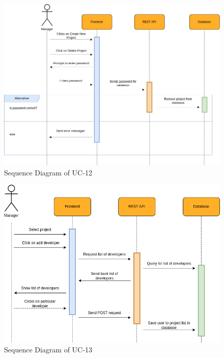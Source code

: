         \begin{figure}[H]
            \centering
            \includegraphics[scale=0.5]{./diagrams/sequence/seq-12.png}
            \caption{Sequence Diagram of UC-12}
            \label{fig:seq-12}
            
        \end{figure}
    

        \begin{figure}[H]
            \centering
            \includegraphics[scale=0.5]{./diagrams/sequence/seq-13.png}
            \caption{Sequence Diagram of UC-13}
            \label{fig:seq-13}
            
        \end{figure}
    

